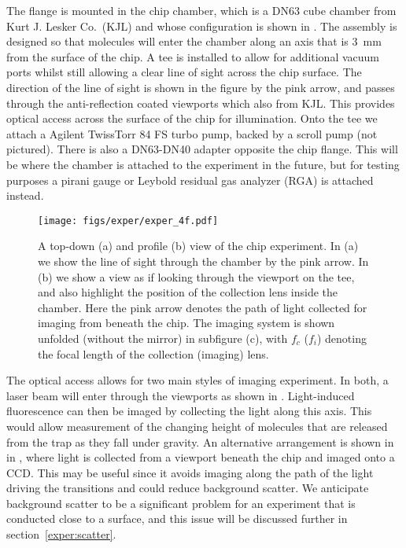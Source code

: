 The flange is mounted in the chip chamber, which is a DN63 cube chamber from
Kurt J.  Lesker Co.\ (KJL) and whose configuration is shown in
.  The assembly is designed so that molecules will
enter the chamber along an axis that is \SI{3}{\milli\meter} from the surface
of the chip. A tee is installed to allow for additional vacuum ports whilst
still allowing a clear line of sight across the chip surface. The direction of
the line of sight is shown in the figure by the pink arrow, and passes through
the anti-reflection coated viewports which also from KJL. This provides optical
access across the surface of the chip for illumination.  Onto the tee we attach
a Agilent TwissTorr 84 FS turbo pump, backed by a scroll pump (not pictured).
There is also a DN63-DN40 adapter opposite the chip flange. This will be where
the chamber is attached to the \CaF{} experiment in the future, but for testing
purposes a pirani gauge or Leybold residual gas analyzer (RGA) is attached
instead.

\begin{figure}
  \centering
  \texttt{[image: figs/exper/exper\_4f.pdf]}
  \caption[Chip chamber testing setup]{
  A top-down (a) and profile (b) view of the chip experiment. In (a)
  we show the line of sight through the chamber by the pink arrow. In (b) we
  show a view as if looking through the viewport on the tee, and also highlight
  the position of the collection lens inside the chamber. Here the
  pink arrow denotes the path of light collected for imaging from beneath the
  chip. The imaging system is shown unfolded (without the mirror) in subfigure
  (c), with $f_c$ ($f_i$) denoting the focal length of the collection (imaging)
  lens.}
  \label{exper:fig:exper}
\end{figure}

The optical access allows for two main styles of imaging experiment. In both, a
laser beam will enter through the viewports as shown in
. Light-induced fluorescence can then be imaged
by collecting the light along this axis. This would allow measurement of the
changing height of molecules that are released from the trap as they fall under
gravity. 
%
An alternative arrangement is shown in in ,
where light is collected from a viewport beneath the chip and imaged onto a
CCD. This may be useful since it avoids imaging along the path of the light
driving the transitions and could reduce background scatter. We anticipate
background scatter to be a significant problem for an experiment that is
conducted close to a surface, and this issue will be discussed further in
section~\ref{exper:scatter}.

